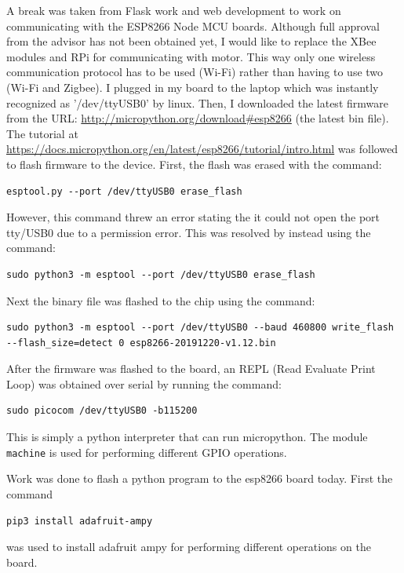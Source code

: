\documentclass[fontsize=11pt, %
                             paper=letter, %
                             twoside, %
                             captions=tableheading,
                             index=totoc,
                             hyperref]{labbook}
\begin{document}
\begin{addmargin}[0cm]{0cm}
A break was taken from Flask work and web development to work on communicating with the ESP8266 Node MCU boards. Although full approval from the advisor has not been obtained yet, I would like to replace the XBee modules and RPi for communicating with motor. This way only one wireless communication protocol has to be used (Wi-Fi) rather than having to use two (Wi-Fi and Zigbee). I plugged in my board to the laptop which was instantly recognized as '/dev/ttyUSB0' by linux. Then, I downloaded the latest firmware from the URL:
\url{http://micropython.org/download#esp8266} (the latest bin file). The tutorial at \url{https://docs.micropython.org/en/latest/esp8266/tutorial/intro.html} was followed to flash firmware to the device. First, the flash was erased with the command:
\begin{Verbatim}
esptool.py --port /dev/ttyUSB0 erase_flash
\end{Verbatim}
However, this command threw an error stating the it could not open the port tty/USB$0$ due to a permission error. This was resolved by instead using the command:
\begin{Verbatim}
sudo python3 -m esptool --port /dev/ttyUSB0 erase_flash
\end{Verbatim}
Next the binary file was flashed to the chip using the command:
\begin{Verbatim}
sudo python3 -m esptool --port /dev/ttyUSB0 --baud 460800 write_flash 
--flash_size=detect 0 esp8266-20191220-v1.12.bin
\end{Verbatim}
After the firmware was flashed to the board, an REPL (Read Evaluate Print Loop) was obtained over serial by running the command:
\begin{Verbatim}
sudo picocom /dev/ttyUSB0 -b115200
\end{Verbatim}
This is simply a python interpreter that can run micropython. The module \texttt{machine} is used for performing different GPIO operations.

Work was done to flash a python program to the esp8266 board today. First the command 
\begin{Verbatim}
pip3 install adafruit-ampy
\end{Verbatim}
was used to install adafruit ampy for performing different operations on the board. 


\end{addmargin}
\end{document}
